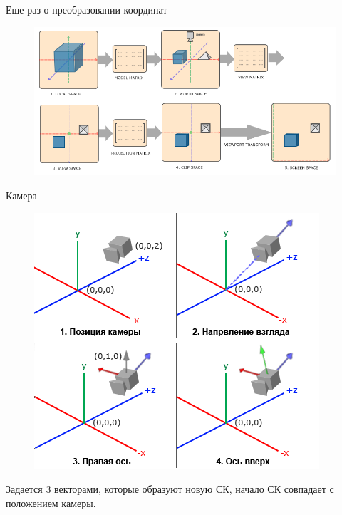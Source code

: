 \documentclass[aspectration=1610,t]{beamer}
\begin{document}
\begin{frame}[fragile]{Еще раз о преобразовании координат}
    \begin{figure}[htp]
        \centering
        \includegraphics[scale=0.40]{res/coord}
    \end{figure}
\end{frame}

\begin{frame}[fragile]{Камера}
    \begin{figure}[htp]
        \centering
        \includegraphics[scale=0.40]{res/cam}
    \end{figure}
    Задается 3 векторами, которые образуют новую СК, начало СК совпадает с положением камеры.
\end{frame}
\end{document}
